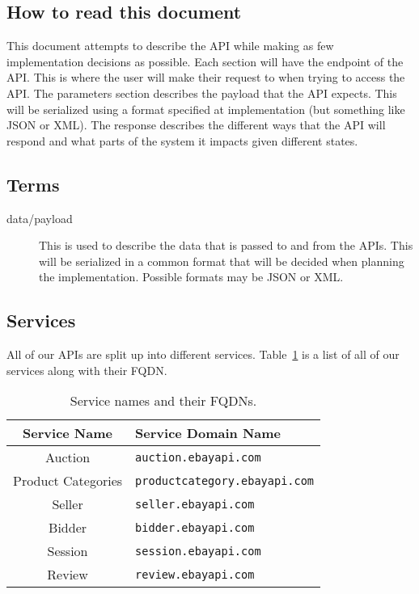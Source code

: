 \documentclass{article}
\newcommand{\code}[1]{\colorbox{light-gray}{\texttt{#1}}}
\begin{document}
\subsection{How to read this document}
This document attempts to describe the API while making as few implementation
decisions as possible. Each section will have the endpoint of the API. This is
where the user will make their request to when trying to access the API. The
parameters section describes the payload that the API expects. This will be
serialized using a format specified at implementation (but something like JSON
or XML). The response describes the different ways that the API will respond
and what parts of the system it impacts given different states.

\subsection{Terms}
\begin{description}
    \item[data/payload] This is used to describe the data that is passed to and
        from the APIs. This will be serialized in a common format that will be
        decided when planning the implementation. Possible formats may be JSON
        or XML.
\end{description}


\subsection{Services}

All of our APIs are split up into different services. Table~\ref{tab:fqdns} is
a list of all of our services along with their FQDN.

\begin{table}
    \centering
\begin{tabular}{|c|l|}
    \hline
    \textbf{Service Name} & \textbf{Service Domain Name} \\
    \hline 
    Auction & \code{auction.ebayapi.com} \\
    Product Categories & \code{productcategory.ebayapi.com} \\
    Seller & \code{seller.ebayapi.com} \\
    Bidder & \code{bidder.ebayapi.com} \\
    Session & \code{session.ebayapi.com} \\
    Review & \code{review.ebayapi.com} \\
    \hline
\end{tabular}
\caption{Service names and their FQDNs.}
\label{tab:fqdns}
\end{table}
\end{document}
